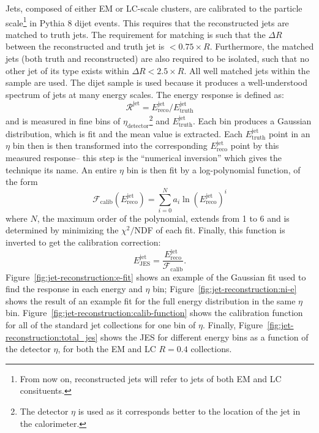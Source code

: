Jets, composed of either EM or LC-scale clusters, are calibrated to the particle scale\footnote{From now on, reconstructed jets will refer to jets of both EM and LC consituents.} in Pythia 8 dijet events. This requires that the reconstructed jets are matched to truth jets. The requirement for matching is such that the $\Delta R$ between the reconstructed and truth jet is $<0.75\times R$. Furthermore, the matched jets (both truth and reconstructed) are also required to be isolated, such that no other jet of its type exists within $\Delta R < 2.5\times R$. All well matched jets within the sample are used. The dijet sample is used because it produces a well-understood spectrum of jets at many energy scales. The energy response is defined as:
%
\begin{equation}
\mathcal{R}^{\mathrm{jet}} = E^{\mathrm{jet}}_{\mathrm{reco}} /  E^{\mathrm{jet}}_{\mathrm{truth}} 
\end{equation}
%
and is measured in fine bins of $\eta_{\mathrm{detector}}$\footnote{The detector $\eta$ is used as it corresponds better to the location of the jet in the calorimeter.} and $E^{\mathrm{jet}}_{\mathrm{truth}}$. Each bin produces a Gaussian distribution, which is fit and the mean value is extracted. Each $E^{\mathrm{jet}}_{\mathrm{truth}}$ point in an $\eta$ bin then is then transformed into the corresponding $E^{\mathrm{jet}}_{\mathrm{reco}}$ point by this measured response-- this step is the ``numerical inversion'' which gives the technique its name. An entire $\eta$ bin is then fit by a log-polynomial function, of the form
%
\begin{equation}
\mathcal{F}_\mathrm{calib}\left(E^{\mathrm{jet}}_{\mathrm{reco}}\right) = \sum_{i=0}^N a_i \ln \left( E^{\mathrm{jet}}_{\mathrm{reco}} \right)^i
\end{equation}
%
where $N$, the maximum order of the polynomial, extends from 1 to 6 and is determined by minimizing the $\chi^2/$NDF of each fit. Finally, this function is inverted to get the calibration correction:
%
\begin{equation}
E^{\mathrm{jet}}_{\mathrm{JES}} = \frac{E^{\mathrm{jet}}_{\mathrm{reco}}}{\mathcal{F}_\mathrm{calib}}.
\end{equation}
%
Figure~\ref{fig:jet-reconstruction:e-fit} shows an example of the Gaussian fit used to find the response in each energy and $\eta$ bin; Figure~\ref{fig:jet-reconstruction:ni-e} shows the result of an example fit for the full energy distribution in the same $\eta$ bin. Figure~\ref{fig:jet-reconstruction:calib-function} shows the calibration function for all of the standard jet collections for one bin of $\eta$. Finally, Figure~\ref{fig:jet-reconstruction:total_jes} shows the JES for different energy bins as a function of the detector $\eta$, for both the EM and LC $R=0.4$ collections.

